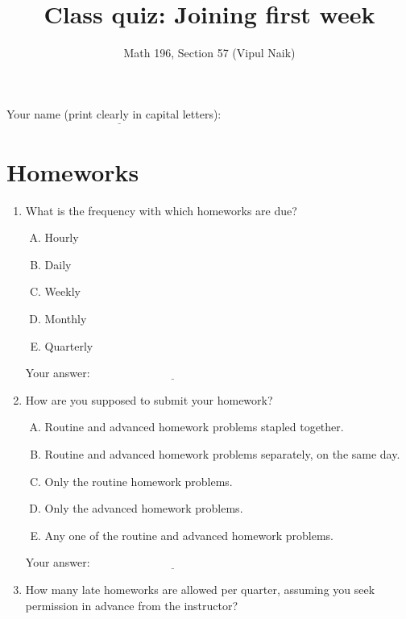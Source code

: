 \documentclass[10pt]{amsart}
\title{Class quiz: Joining first week}
\author{Math 196, Section 57 (Vipul Naik)}
\begin{document}
\maketitle

Your name (print clearly in capital letters): $\underline{\qquad\qquad\qquad\qquad\qquad\qquad\qquad\qquad\qquad\qquad}$

\section{Homeworks}

\begin{enumerate}
\item What is the frequency with which homeworks are due?

  \begin{enumerate}[(A)]
  \item Hourly
  \item Daily
  \item Weekly
  \item Monthly
  \item Quarterly
  \end{enumerate}

  \vspace{0.1in}
  Your answer: $\underline{\qquad\qquad\qquad\qquad\qquad\qquad\qquad}$
  \vspace{0.1in}

\item How are you supposed to submit your homework?

  \begin{enumerate}[(A)]
  \item Routine and advanced homework problems stapled together.
  \item Routine and advanced homework problems separately, on the same
    day.
  \item Only the routine homework problems.
  \item Only the advanced homework problems.
  \item Any one of the routine and advanced homework problems.
  \end{enumerate}

  \vspace{0.1in}
  Your answer: $\underline{\qquad\qquad\qquad\qquad\qquad\qquad\qquad}$
  \vspace{0.1in}

\item How many late homeworks are allowed per quarter, assuming you
  seek permission in advance from the instructor?


\end{enumerate}
\end{document}
